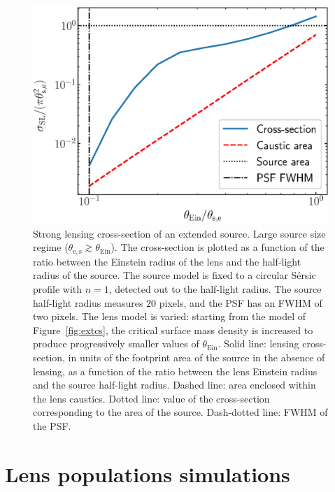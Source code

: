 \documentclass{aa}
\def\tein{\theta_{\mathrm{Ein}}}
\def\Fref#1{Figure~\ref{#1}\xspace}
\begin{document}
\begin{figure}
\includegraphics[width=\columnwidth]{largesource_cs.eps}
\caption{
Strong lensing cross-section of an extended source. Large source size regime ($\theta_{\mathrm{e,s}} \gtrsim \tein$).
The cross-section is plotted as a function of the ratio between the Einstein radius of the lens and the half-light radius of the source.
The source model is fixed to a circular S\'{e}rsic profile with $n=1$, detected out to the half-light radius.
The source half-light radius measures $20$ pixels, and the PSF has an FWHM of two pixels.
The lens model is varied: starting from the model of \Fref{fig:extcs}, the critical surface mass density is increased to produce progressively smaller values of $\tein$.
Solid line: lensing cross-section, in units of the footprint area of the source in the absence of lensing, as a function of the ratio between the lens Einstein radius and the source half-light radius.
Dashed line: area enclosed within the lens caustics.
Dotted line: value of the cross-section corresponding to the area of the source.
Dash-dotted line: FWHM of the PSF.
\label{fig:largesourcecs}
}
\end{figure}


\section{Lens populations simulations}\label{sect:lenspop}
\end{document}
